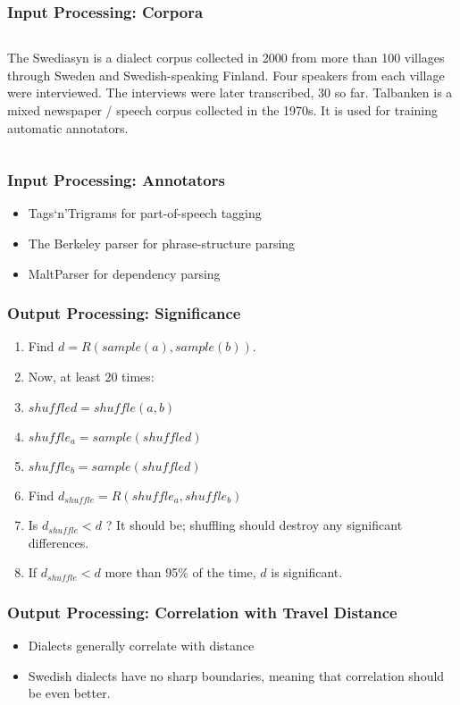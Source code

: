 \documentclass{beamer}
\begin{document}
\begin{frame}
  \frametitle{Input Processing: Corpora}
  \begin{columns}
    The Swediasyn is a dialect corpus collected in 2000 from more than
    100 villages through Sweden and Swedish-speaking Finland. Four
    speakers from each village were interviewed. The interviews were
    later transcribed, 30 so far.
    Talbanken is a mixed newspaper / speech corpus collected in the
    1970s. It is used for training automatic annotators.
  \end{columns}
\end{frame}
\begin{frame}
  \frametitle{Input Processing: Annotators}
  \begin{itemize}
  \item Tags`n'Trigrams for part-of-speech tagging
  \item The Berkeley parser for phrase-structure parsing
  \item MaltParser for dependency parsing
  \end{itemize}
\end{frame}
\begin{frame}
  \frametitle{Output Processing: Significance}
  \begin{enumerate}
  \item Find $d = R(sample(a),sample(b))$.
  \item Now, at least 20 times:
  \item $shuffled = shuffle(a,b)$
  \item $shuffle_a = sample(shuffled)$
  \item $shuffle_b = sample(shuffled)$
  \item Find $d_{shuffle} = R(shuffle_a,shuffle_b)$
  \item Is $d_{shuffle} < d$ ? It should be; shuffling should destroy any significant differences.
  \item If $d_{shuffle} < d$ more than 95\% of the time, $d$ is significant.
  \end{enumerate}
\end{frame}
\begin{frame}
  \frametitle{Output Processing: Correlation with Travel Distance}
 \begin{itemize}
  \item Dialects generally correlate with distance
  \item Swedish dialects have no sharp boundaries, meaning that
    correlation should be even better.
 \end{itemize}
\end{frame}
\end{document}
